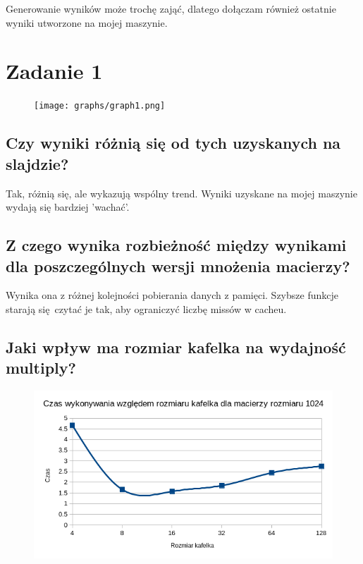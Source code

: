 \documentclass[a4paper,12pt]{mwart} %
\begin{document}
Generowanie wyników może trochę zająć, dlatego dołączam również ostatnie wyniki utworzone na mojej maszynie.
\section*{Zadanie 1}

\begin{figure}[h!]
  \texttt{[image: graphs/graph1.png]}
\end{figure}

\subsection*{Czy wyniki różnią się od tych uzyskanych na slajdzie?}

Tak, różnią się, ale wykazują wspólny trend. Wyniki uzyskane na mojej maszynie wydają się bardziej 'wachać'.

\subsection*{Z czego wynika rozbieżność między wynikami dla poszczególnych wersji mnożenia macierzy?}

Wynika ona z różnej kolejności pobierania danych z pamięci. Szybsze funkcje starają się czytać je tak, aby ograniczyć liczbę missów w cacheu.


\subsection*{Jaki wpływ ma rozmiar kafelka na wydajność multiply?}

\begin{figure}[h!]
  \includegraphics[width=\linewidth]{graphs/graph1-2.png}
\end{figure}
\end{document}
